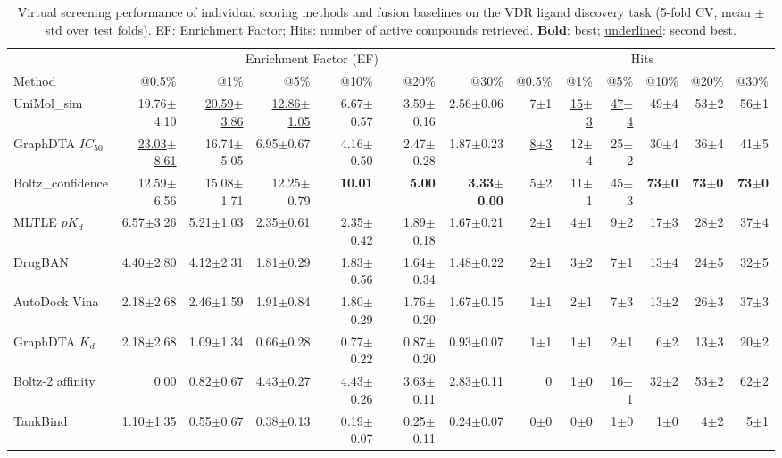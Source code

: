\begin{table}[htbp!]
\centering
\caption{Virtual screening performance of individual scoring methods and fusion baselines on the VDR ligand discovery task (5-fold CV, mean $\pm$ std over test folds). EF: Enrichment Factor; Hits: number of active compounds retrieved. \textbf{Bold}: best; \underline{underlined}: second best.}
\label{tab:fusion_performance}
\small
\begin{tabular}{lrrrrrr|rrrrrr}
\toprule
& \multicolumn{6}{c|}{Enrichment Factor (EF)} & \multicolumn{6}{c}{Hits} \\
Method & @0.5\% & @1\% & @5\% & @10\% & @20\% & @30\% & @0.5\% & @1\% & @5\% & @10\% & @20\% & @30\% \\
\midrule
UniMol_sim & 19.76$\pm$4.10 & \underline{20.59$\pm$3.86} & \underline{12.86$\pm$1.05} & 6.67$\pm$0.57 & 3.59$\pm$0.16 & 2.56$\pm$0.06 & 7$\pm$1 & \underline{15$\pm$3} & \underline{47$\pm$4} & 49$\pm$4 & 53$\pm$2 & 56$\pm$1 \\
GraphDTA $IC_{50}$ & \underline{23.03$\pm$8.61} & 16.74$\pm$5.05 & 6.95$\pm$0.67 & 4.16$\pm$0.50 & 2.47$\pm$0.28 & 1.87$\pm$0.23 & \underline{8$\pm$3} & 12$\pm$4 & 25$\pm$2 & 30$\pm$4 & 36$\pm$4 & 41$\pm$5 \\
Boltz_confidence & 12.59$\pm$6.56 & 15.08$\pm$1.71 & 12.25$\pm$0.79 & \textbf{10.01} & \textbf{5.00} & \textbf{3.33$\pm$0.00} & 5$\pm$2 & 11$\pm$1 & 45$\pm$3 & \textbf{73$\pm$0} & \textbf{73$\pm$0} & \textbf{73$\pm$0} \\
MLTLE $pK_d$ & 6.57$\pm$3.26 & 5.21$\pm$1.03 & 2.35$\pm$0.61 & 2.35$\pm$0.42 & 1.89$\pm$0.18 & 1.67$\pm$0.21 & 2$\pm$1 & 4$\pm$1 & 9$\pm$2 & 17$\pm$3 & 28$\pm$2 & 37$\pm$4 \\
DrugBAN & 4.40$\pm$2.80 & 4.12$\pm$2.31 & 1.81$\pm$0.29 & 1.83$\pm$0.56 & 1.64$\pm$0.34 & 1.48$\pm$0.22 & 2$\pm$1 & 3$\pm$2 & 7$\pm$1 & 13$\pm$4 & 24$\pm$5 & 32$\pm$5 \\
AutoDock Vina & 2.18$\pm$2.68 & 2.46$\pm$1.59 & 1.91$\pm$0.84 & 1.80$\pm$0.29 & 1.76$\pm$0.20 & 1.67$\pm$0.15 & 1$\pm$1 & 2$\pm$1 & 7$\pm$3 & 13$\pm$2 & 26$\pm$3 & 37$\pm$3 \\
GraphDTA $K_{d}$ & 2.18$\pm$2.68 & 1.09$\pm$1.34 & 0.66$\pm$0.28 & 0.77$\pm$0.22 & 0.87$\pm$0.20 & 0.93$\pm$0.07 & 1$\pm$1 & 1$\pm$1 & 2$\pm$1 & 6$\pm$2 & 13$\pm$3 & 20$\pm$2 \\
Boltz-2 affinity & 0.00 & 0.82$\pm$0.67 & 4.43$\pm$0.27 & 4.43$\pm$0.26 & 3.63$\pm$0.11 & 2.83$\pm$0.11 & 0 & 1$\pm$0 & 16$\pm$1 & 32$\pm$2 & 53$\pm$2 & 62$\pm$2 \\
TankBind & 1.10$\pm$1.35 & 0.55$\pm$0.67 & 0.38$\pm$0.13 & 0.19$\pm$0.07 & 0.25$\pm$0.11 & 0.24$\pm$0.07 & 0$\pm$0 & 0$\pm$0 & 1$\pm$0 & 1$\pm$0 & 4$\pm$2 & 5$\pm$1 \\

\end{tabular}
\end{table}
